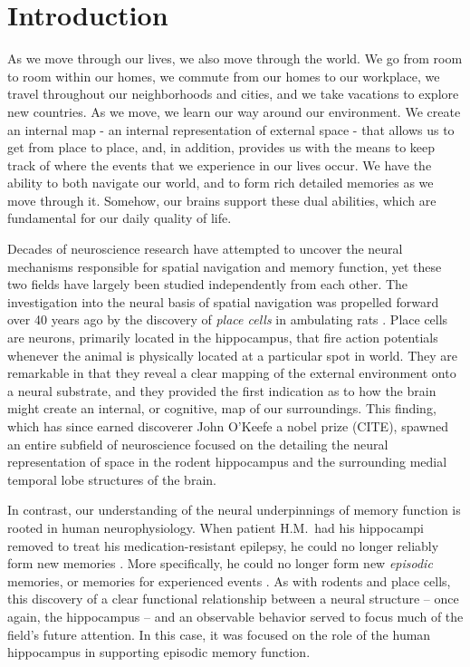 \chapter{Introduction}
\large


%
%
%

As we move through our lives, we also move through the world. We go from room to room within our homes, we commute from our homes to our workplace, we travel throughout our neighborhoods and cities, and we take vacations to explore new countries. As we move, we learn our way around our environment. We create an internal map - an internal representation of external space - that allows us to get from place to place, and, in addition, provides us with the means to keep track of where the events that we experience in our lives occur. We have the ability to both navigate our world, and to form rich detailed memories as we move through it. Somehow, our brains support these dual abilities, which are fundamental for our daily quality of life.

Decades of neuroscience research have attempted to uncover the neural mechanisms responsible for spatial navigation and memory function, yet these two fields have largely been studied independently from each other. The investigation into the neural basis of spatial navigation was propelled forward over 40 years ago by the discovery of \textit{place cells} in ambulating rats \citep{OKeeDost71}. Place cells are neurons, primarily located in the hippocampus, that fire action potentials whenever the animal is physically located at a particular spot in world. They are remarkable in that they reveal a clear mapping of the external environment onto a neural substrate, and they provided the first indication as to how the brain might create an internal, or cognitive, map of our surroundings. This finding, which has since earned discoverer John O'Keefe a nobel prize (CITE), spawned an entire subfield of neuroscience focused on the detailing the neural representation of space in the rodent hippocampus and the surrounding medial temporal lobe structures of the brain.

In contrast, our understanding of the neural underpinnings of memory function is rooted in human neurophysiology. When patient H.M.\ had his hippocampi removed to treat his medication-resistant epilepsy, he could no longer reliably form new memories \citep{ScovMiln57}. More specifically, he could no longer form new \textit{episodic} memories, or memories for experienced events \citep{Tulv72}. As with rodents and  place cells, this discovery of a clear functional relationship between a neural structure -- once again, the hippocampus -- and an observable behavior served to focus much of the field's future attention. In this case, it was focused on the role of the human hippocampus in supporting episodic memory function.

